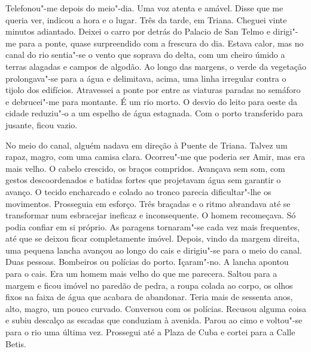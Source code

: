 Telefonou"-me depois do meio"-dia. Uma voz atenta e amável. Disse que me
queria ver, indicou a hora e o lugar. Três da tarde, em Triana. Cheguei
vinte minutos adiantado. Deixei o carro por detrás do Palacio de San
Telmo e dirigi"-me para a ponte, quase surpreendido com a frescura do
dia. Estava calor, mas no canal do rio sentia"-se o vento que soprava do
delta, com um cheiro úmido a terras alagadas e campos de algodão. Ao
longo das margens, o verde da vegetação prolongava"-se para a água e
delimitava, acima, uma linha irregular contra o tijolo dos edifícios.
Atravessei a ponte por entre as viaturas paradas no semáforo e
debrucei"-me para montante. É um rio morto. O desvio do leito para oeste
da cidade reduziu"-o a um espelho de água estagnada. Com o porto
transferido para jusante, ficou vazio.

No meio do canal, alguém nadava em direção à Puente de Triana. Talvez
um rapaz, magro, com uma camisa clara. Ocorreu"-me que poderia ser Amir,
mas era mais velho. O cabelo crescido, os braços compridos. Avançava sem
som, com gestos descoordenados e batidas fortes que projetavam água sem
garantir o avanço. O tecido encharcado e colado ao tronco parecia
dificultar"-lhe os movimentos. Prosseguia em esforço. Três braçadas e o
ritmo abrandava até se transformar num esbracejar ineficaz e
inconsequente. O homem recomeçava. Só podia confiar em si próprio. As
paragens tornaram"-se cada vez mais frequentes, até que se deixou ficar
completamente imóvel. Depois, vindo da margem direita, uma pequena
lancha avançou ao longo do cais e dirigiu"-se para o meio do canal. Duas
pessoas. Bombeiros ou polícias do porto. Içaram"-no. A lancha apontou
para o cais. Era um homem mais velho do que me parecera. Saltou para a
margem e ficou imóvel no paredão de pedra, a roupa colada ao corpo, os
olhos fixos na faixa de água que acabara de abandonar. Teria mais de
sessenta anos, alto, magro, um pouco curvado. Conversou com os polícias.
Recusou alguma coisa e subiu descalço as escadas que conduziam à
avenida. Parou ao cimo e voltou"-se para o rio uma última vez. Prossegui
até a Plaza de Cuba e cortei para a Calle Betis.

